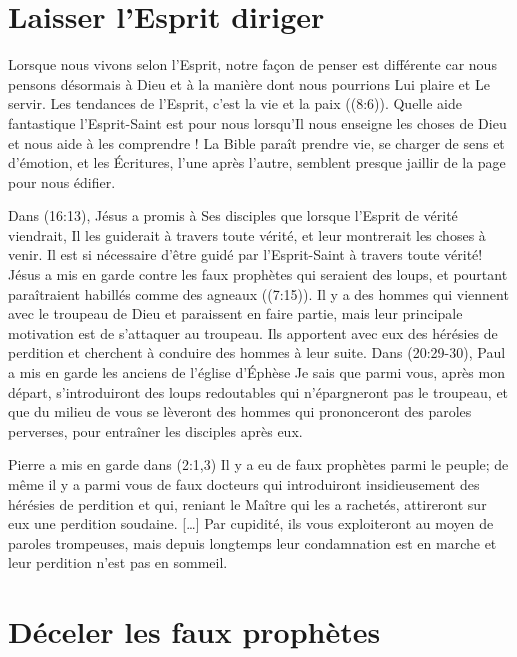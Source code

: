\section{Laisser l'Esprit diriger}

Lorsque nous vivons selon l'Esprit, notre façon de penser est différente
 car nous pensons désormais à Dieu et à la manière dont nous pourrions
 Lui plaire et Le servir.
 Les tendances de l'Esprit, c'est la vie et la paix ((8:6)).
 Quelle aide fantastique l'Esprit-Saint est pour nous lorsqu'Il nous enseigne
 les choses de Dieu et nous aide à les comprendre !
 La Bible paraît prendre vie, se charger de sens et d'émotion,
 et les Écritures, l'une après l'autre, semblent presque jaillir
 de la page pour nous édifier.

Dans (16:13), Jésus a promis à Ses disciples
 que lorsque l'Esprit de vérité viendrait,
 Il les guiderait à travers toute vérité,
 et leur montrerait les choses à venir.
 Il est si nécessaire d'être guidé par l'Esprit-Saint
 à travers toute vérité!
 Jésus a mis en garde contre les faux prophètes qui seraient des loups,
 et pourtant paraîtraient habillés comme des agneaux ((7:15)).
 Il y a des hommes qui viennent avec le troupeau de Dieu
 et paraissent en faire partie, mais leur principale motivation
 est de s'attaquer au troupeau.
 Ils apportent avec eux des hérésies de perdition
 et cherchent à conduire des hommes à leur suite.
 Dans (20:29-30),
 Paul a mis en garde les anciens de l'église d'Éphèse\frcolon{}
 \Og Je sais que parmi vous, après mon départ,
 s'introduiront des loups redoutables
 qui n'épargneront pas le troupeau,
 et que du milieu de vous se lèveront des hommes
 qui prononceront des paroles perverses,
 pour entraîner les disciples après eux. \Fg{}

Pierre a mis en garde dans (2:1,3)\frcolon{}
 \Og Il y a eu de faux prophètes parmi le peuple;
 de même il y a parmi vous de faux docteurs
 qui introduiront insidieusement des hérésies de perdition et qui,
 reniant le Maître qui les a rachetés,
 attireront sur eux une perdition soudaine. [\dots{}]
 Par cupidité, ils vous exploiteront au moyen de paroles trompeuses,
 mais depuis longtemps leur condamnation est en marche
 et leur perdition n'est pas en sommeil. \Fg{}


\section{D\'eceler les faux proph\`etes}

